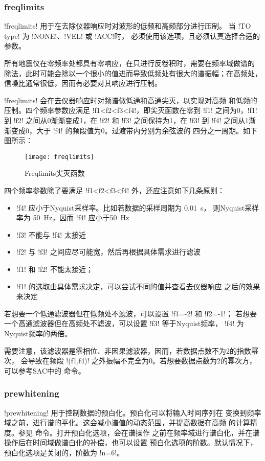 \subsubsection{freqlimits}
!freqlimits! 用于在去除仪器响应时对波形的低频和高频部分进行压制。
当 !TO type! 为 !NONE!、!VEL! 或 !ACC!时，
必须使用该选项，且必须认真选择合适的参数。

所有地震仪在零频率处都具有零响应，在只进行反卷积时，需要在频率域做谱的
除法，此时可能会除以一个很小的值进而导致低频处有很大的谱振幅；在高频处，
信噪比通常很低，因而有必要对其响应进行压制。

!freqlimits! 会在去仪器响应时对频谱做低通和高通尖灭，以实现对高频
和低频的压制。四个频率参数应满足 !f1<f2<f3<f4!，即尖灭函数在零到
!f1! 之间为0，!f1! 到 !f2! 之间从0渐渐变成1，在
!f2! 和 !f3! 之间保持为1，在 !f3! 到 !f4!
之间从1渐渐变成0，大于 !f4! 的频段值为0。过渡带内分别为余弦波的
四分之一周期。如下图所示：

\begin{figure}[H]
\centering
\texttt{[image: freqlimits]}
\caption{Freqlimits尖灭函数}
\label{fig:freqlimits}
\end{figure}

四个频率参数除了要满足 !f1<f2<f3<f4! 外，还应注意如下几条原则：
\begin{itemize}
\item !f4! 应小于Nyquist采样率。比如若数据的采样周期为 \SI{0.01}{\s}，
    则Nyquist采样率为 \SI{50}{\Hz}，因而 !f4! 应小于\SI{50}{\Hz}
\item !f3! 不能与 !f4! 太接近
\item !f2! 与 !f3! 之间应尽可能宽，然后再根据具体需求进行滤波
\item !f1! 和 !f2! 不能太接近；
\item !f1! 的选取由具体需求决定，可以尝试不同的值并查看去仪器响应
    之后的效果来决定
\end{itemize}

若想要一个低通滤波器但在低频处不滤波，可以设置 !f1=-2! 和 !f2=-1!；
若想要一个高通滤波器但在高频处不滤波，可以设置 !f3! 等于Nyquist频率，
!f4! 为Nyquist频率的两倍。

需要注意，该滤波器是零相位、非因果滤波器，因而，若数据点数不为2的指数幂次，
会导致在频段 !(f1,f4)! 之外振幅不完全为0。若想要数据点数为2的幂次方，
可以参考SAC中的  命令。

\subsubsection{prewhitening}
!prewhitening! 用于控制数据的预白化。预白化可以将输入时间序列在
变换到频率域之前，进行谱的平化。这会减小谱值的动态范围，并提高数据在高频
的计算精度。参见  命令。打开预白化选项，会在谱操作
之前在频率域进行谱白化，并在谱操作后在时间域做谱白化的补偿，也可以设置
预白化选项的阶数。默认情况下，预白化选项是关闭的，阶数为 !n=6!。

